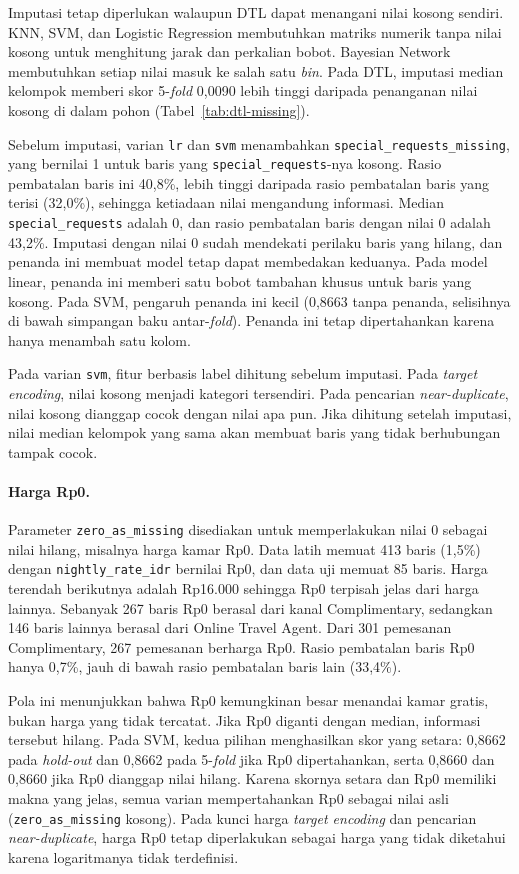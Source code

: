 Imputasi tetap diperlukan walaupun DTL dapat menangani nilai kosong sendiri.
KNN, SVM, dan Logistic Regression membutuhkan matriks numerik tanpa nilai kosong
untuk menghitung jarak dan perkalian bobot. Bayesian Network membutuhkan setiap
nilai masuk ke salah satu \textit{bin}. Pada DTL, imputasi median kelompok memberi
skor 5-\textit{fold} 0,0090 lebih tinggi daripada penanganan nilai kosong di
dalam pohon (Tabel~\ref{tab:dtl-missing}).

Sebelum imputasi, varian \texttt{lr} dan \texttt{svm} menambahkan
\texttt{special\_requests\_missing}, yang bernilai 1 untuk baris yang
\texttt{special\_requests}-nya kosong. Rasio pembatalan baris ini 40,8\%, lebih
tinggi daripada rasio pembatalan baris yang terisi (32,0\%), sehingga ketiadaan
nilai mengandung informasi. Median \texttt{special\_requests} adalah 0, dan rasio
pembatalan baris dengan nilai 0 adalah 43,2\%. Imputasi dengan nilai 0 sudah
mendekati perilaku baris yang hilang, dan penanda ini membuat model tetap dapat
membedakan keduanya. Pada model linear, penanda ini memberi satu bobot tambahan
khusus untuk baris yang kosong. Pada SVM, pengaruh penanda ini kecil (0,8663
tanpa penanda, selisihnya di bawah simpangan baku antar-\textit{fold}). Penanda
ini tetap dipertahankan karena hanya menambah satu kolom.

Pada varian \texttt{svm}, fitur berbasis label dihitung sebelum imputasi. Pada
\textit{target encoding}, nilai kosong menjadi kategori tersendiri. Pada pencarian
\textit{near-duplicate}, nilai kosong dianggap cocok dengan nilai apa pun. Jika
dihitung setelah imputasi, nilai median kelompok yang sama akan membuat baris yang
tidak berhubungan tampak cocok.

\paragraph{Harga Rp0.} Parameter \texttt{zero\_as\_missing} disediakan untuk
memperlakukan nilai 0 sebagai nilai hilang, misalnya harga kamar Rp0. Data latih
memuat 413 baris (1,5\%) dengan \texttt{nightly\_rate\_idr} bernilai Rp0, dan data
uji memuat 85 baris. Harga terendah berikutnya adalah Rp16.000 sehingga Rp0
terpisah jelas dari harga lainnya. Sebanyak 267 baris Rp0 berasal dari kanal
Complimentary, sedangkan 146 baris lainnya berasal dari Online Travel Agent. Dari
301 pemesanan Complimentary, 267 pemesanan berharga Rp0. Rasio pembatalan baris
Rp0 hanya 0,7\%, jauh di bawah rasio pembatalan baris lain (33,4\%).

Pola ini menunjukkan bahwa Rp0 kemungkinan besar menandai kamar gratis, bukan
harga yang tidak tercatat. Jika Rp0 diganti dengan median, informasi tersebut
hilang. Pada SVM, kedua pilihan menghasilkan skor yang setara: 0,8662 pada
\textit{hold-out} dan 0,8662 pada 5-\textit{fold} jika Rp0 dipertahankan, serta
0,8660 dan 0,8660 jika Rp0 dianggap nilai hilang. Karena skornya setara dan Rp0
memiliki makna yang jelas, semua varian mempertahankan Rp0 sebagai nilai asli
(\texttt{zero\_as\_missing} kosong). Pada kunci harga \textit{target encoding} dan
pencarian \textit{near-duplicate}, harga Rp0 tetap diperlakukan sebagai harga yang
tidak diketahui karena logaritmanya tidak terdefinisi.

